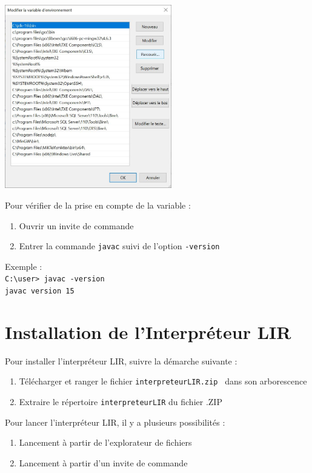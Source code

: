     \begin{center}
        \includegraphics[height=8cm]{./img/installation-variable-environnement.JPG}
    \end{center}

    Pour vérifier de la prise en compte de la variable :
    \begin{enumerate}
        \item Ouvrir un invite de commande
        \item Entrer la commande \verb|javac| suivi de l'option \verb|-version|
    \end{enumerate}


    Exemple :
    \\ \verb|C:\user> javac -version|
    \\ \verb|javac version 15|

\section{Installation de l'Interpréteur LIR}
    Pour installer l'interpréteur LIR, suivre la démarche suivante :
    \begin{enumerate}
        \item Télécharger et ranger le fichier \verb|interpreteurLIR.zip |
              dans son arborescence
        \item Extraire le répertoire \verb|interpreteurLIR| du fichier .ZIP
    \end{enumerate}

    Pour lancer l'interpréteur LIR, il y a plusieurs possibilités :
    \begin{enumerate}
        \item Lancement à partir de l'explorateur de fichiers
        \item Lancement à partir d'un invite de commande
    \end{enumerate}

